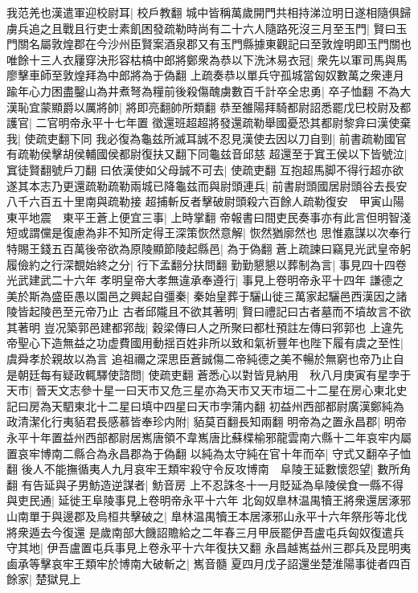 我范羌也漢遣軍迎校尉耳|{
	校戶教翻}
城中皆稱萬歲開門共相持涕泣明日遂相隨俱歸虜兵追之且戰且行吏士素飢困發疏勒時尚有二十六人隨路死沒三月至玉門|{
	賢曰玉門關名屬敦煌郡在今沙州臣賢案酒泉郡又有玉門縣據東觀記曰至敦煌明即玉門關也}
唯餘十三人衣屨穿決形容枯槁中郎將鄭衆為恭以下洗沐易衣冠|{
	衆先以軍司馬與馬廖擊車師至敦煌拜為中郎將為于偽翻}
上疏奏恭以單兵守孤城當匈奴數萬之衆連月踰年心力困盡鑿山為井煮弩為糧前後殺傷醜虜數百千計卒全忠勇|{
	卒子恤翻}
不為大漢恥宜蒙顯爵以厲將帥|{
	將即亮翻帥所類翻}
恭至雒陽拜騎都尉詔悉罷戊巳校尉及都護官|{
	二官明帝永平十七年置}
徵還班超超將發還疏勒舉國憂恐其都尉黎弇曰漢使棄我|{
	使疏吏翻下同}
我必復為龜兹所滅耳誠不忍見漢使去因以刀自剄|{
	前書疏勒國官有疏勒侯擊胡侯輔國侯都尉復扶又翻下同龜兹音邱慈}
超還至于窴王侯以下皆號泣|{
	窴徒賢翻號戶刀翻}
曰依漢使如父母誠不可去|{
	使疏吏翻}
互抱超馬脚不得行超亦欲遂其本志乃更還疏勒疏勒兩城已降龜兹而與尉頭連兵|{
	前書尉頭國居尉頭谷去長安八千六百五十里南與疏勒接}
超捕斬反者擊破尉頭殺六百餘人疏勒復安　甲寅山陽東平地震　東平王蒼上便宜三事|{
	上時掌翻}
帝報書曰間吏民奏事亦有此言但明智淺短或謂儻是復慮為非不知所定得王深策恢然意解|{
	恢然猶廓然也}
思惟嘉謀以次奉行特賜王錢五百萬後帝欲為原陵顯節陵起縣邑|{
	為于偽翻}
蒼上疏諫曰竊見光武皇帝躬履儉約之行深覩始終之分|{
	行下孟翻分扶問翻}
勤勤懇懇以葬制為言|{
	事見四十四卷光武建武二十六年}
孝明皇帝大孝無違承奉遵行|{
	事見上卷明帝永平十四年}
謙德之美於斯為盛臣愚以園邑之興起自彊秦|{
	秦始皇葬于驪山徙三萬家起驪邑西漢因之諸陵皆起陵邑至元帝乃止}
古者邱隴且不欲其著明|{
	賢曰禮記曰古者墓而不墳故言不欲其著明}
豈况築郭邑建都郛哉|{
	穀梁傳曰人之所聚曰都杜預註左傳曰郛郭也}
上違先帝聖心下造無益之功虚費國用動揺百姓非所以致和氣祈豐年也陛下履有虞之至性|{
	虞舜孝於親故以為言}
追祖禰之深思臣蒼誠傷二帝純德之美不暢於無窮也帝乃止自是朝廷每有疑政輒驛使諮問|{
	使疏吏翻}
蒼悉心以對皆見納用　秋八月庚寅有星孛于天市|{
	晉天文志參十星一曰天市又危三星亦為天市又天市垣二十二星在房心東北史記曰房為天駟東北十二星曰填中四星曰天市孛蒲内翻}
初益州西部都尉廣漢鄭純為政清潔化行夷貊君長感慕皆奉珍内附|{
	貊莫百翻長知兩翻}
明帝為之置永昌郡|{
	明帝永平十年置益州西部都尉居嶲唐領不韋嶲唐比蘇楪榆邪龍雲南六縣十二年哀牢内屬置哀牢博南二縣合為永昌郡為于偽翻}
以純為太守純在官十年而卒|{
	守式又翻卒子恤翻}
後人不能撫循夷人九月哀牢王類牢殺守令反攻博南　阜陵王延數懷怨望|{
	數所角翻}
有告延與子男魴造逆謀者|{
	魴音房}
上不忍誅冬十一月貶延為阜陵侯食一縣不得與吏民通|{
	延徙王阜陵事見上卷明帝永平十六年}
北匈奴臯林温禺犢王將衆還居涿邪山南單于與邊郡及烏桓共擊破之|{
	臯林温禺犢王本居涿邪山永平十六年祭彤等北伐將衆遁去今復還}
是歲南部大饑詔贍給之二年春三月甲辰罷伊吾盧屯兵匈奴復遣兵守其地|{
	伊吾盧置屯兵事見上卷永平十六年復扶又翻}
永昌越嶲益州三郡兵及昆明夷鹵承等擊哀牢王類牢於博南大破斬之|{
	嶲音髓}
夏四月戊子詔還坐楚淮陽事徙者四百餘家|{
	楚獄見上}


